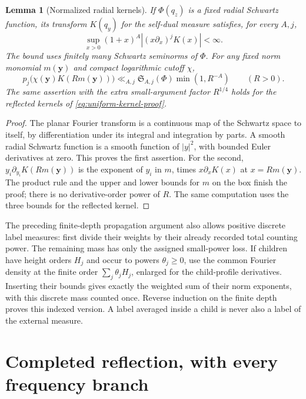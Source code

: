 \documentclass[12pt]{article}
\newtheorem{lemma}[theorem]{Lemma}
\begin{document}
\begin{lemma}[Normalized radial kernels]\label{lem:kernel-seminorms}
If \(\Phi(q_z)\) is a fixed radial Schwartz function, its transform
\(K(q_y)\) for the self-dual measure satisfies, for every \(A,j\),
\[
 \sup_{x>0}(1+x)^A|(x\partial_x)^jK(x)|<\infty.
\]
The bound uses finitely many Schwartz seminorms of \(\Phi\).
For any fixed norm monomial \(m(\mathbf y)\) and compact
logarithmic cutoff \(\chi\),
\begin{equation}\label{eq:normalized-kernel-profile}
 p_j\bigl(\chi(\mathbf y)K(Rm(\mathbf y))\bigr)
       \ll_{A,j}\mathfrak S_{A,j}(\Phi)\min(1,R^{-A})
       \qquad(R>0).
\end{equation}
The same assertion with the extra small-argument factor
\(R^{1/4}\) holds for the reflected kernels of
\eqref{eq:uniform-kernel-proof}.
\end{lemma}
\begin{proof}
The planar Fourier transform is a continuous map of the Schwartz
space to itself, by differentiation under its integral and integration
by parts.  A smooth radial Schwartz function is a smooth function
of \(|y|^2\), with bounded Euler derivatives at zero.
This proves the first assertion.  For the second,
\(y_i\partial_{y_i}K(Rm(\mathbf y))\) is the exponent of \(y_i\)
in \(m\), times \(x\partial_xK(x)\) at \(x=Rm(\mathbf y)\).
The product rule and the upper and lower bounds for \(m\) on the
box finish the proof; there is no derivative-order power of \(R\).
The same computation uses the three bounds for the reflected kernel.
\end{proof}

The preceding finite-depth propagation argument also allows positive
discrete label measures: first divide their weights by their already
recorded total counting power.  The remaining mass has only the
assigned small-power loss.  If children have height orders \(H_j\)
and occur to powers \(\theta_j\ge0\), use the common Fourier
density at the finite order \(\sum_j\theta_jH_j\), enlarged for
the child-profile derivatives.  Inserting their bounds gives
exactly the weighted sum of their norm exponents, with this discrete
mass counted once.  Reverse induction on the finite depth proves
this indexed version.  A label averaged inside a child is never
also a label of the external measure.

\section{Completed reflection, with every frequency branch}
\label{app:reflection}
\end{document}
